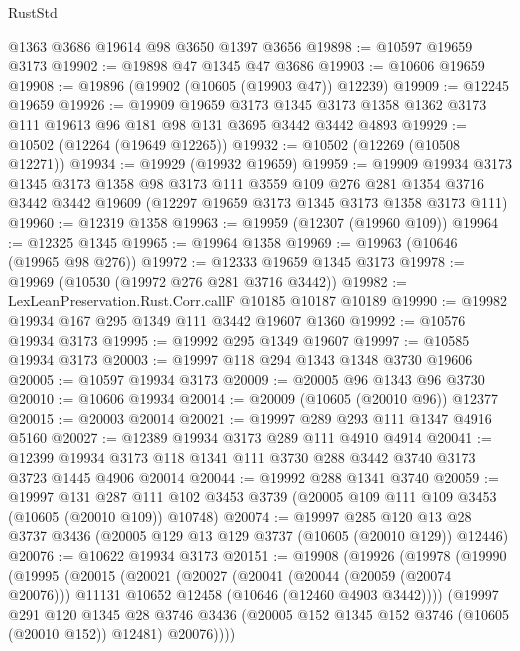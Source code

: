 \begin{lexlean}{RustStd}
\begin{coremodule}
    @1363
    @3686
    @19614
    @98
    @3650
    @1397
    @3656
@19898 := @10597 @19659 @3173
@19902 := @19898 @47 @1345 @47 @3686
@19903 := @10606 @19659
@19908 := @19896 (@19902 (@10605 (@19903 @47)) @12239)
@19909 := @12245 @19659
@19926 := @19909
    @19659
    @3173
    @1345
    @3173
    @1358
    @1362
    @3173
    @111
    @19613
    @96
    @181
    @98
    @131
    @3695
    @3442
    @3442
    @4893
@19929 := @10502 (@12264 (@19649 @12265))
@19932 := @10502 (@12269 (@10508 @12271))
@19934 := @19929 (@19932 @19659)
@19959 := @19909
    @19934
    @3173
    @1345
    @3173
    @1358
    @98
    @3173
    @111
    @3559
    @109
    @276
    @281
    @1354
    @3716
    @3442
    @3442
    @19609
    (@12297 @19659 @3173 @1345 @3173 @1358 @3173 @111)
@19960 := @12319 @1358
@19963 := @19959 (@12307 (@19960 @109))
@19964 := @12325 @1345
@19965 := @19964 @1358
@19969 := @19963 (@10646 (@19965 @98 @276))
@19972 := @12333 @19659 @1345 @3173
@19978 := @19969 (@10530 (@19972 @276 @281 @3716 @3442))
@19982 := LexLeanPreservation.Rust.Corr.callF @10185 @10187 @10189
@19990 := @19982 @19934 @167 @295 @1349 @111 @3442 @19607 @1360
@19992 := @10576 @19934 @3173
@19995 := @19992 @295 @1349 @19607
@19997 := @10585 @19934 @3173
@20003 := @19997 @118 @294 @1343 @1348 @3730 @19606
@20005 := @10597 @19934 @3173
@20009 := @20005 @96 @1343 @96 @3730
@20010 := @10606 @19934
@20014 := @20009 (@10605 (@20010 @96)) @12377
@20015 := @20003 @20014
@20021 := @19997 @289 @293 @111 @1347 @4916 @5160
@20027 := @12389 @19934 @3173 @289 @111 @4910 @4914
@20041 := @12399 @19934 @3173 @118 @1341 @111 @3730 @288 @3442 @3740 @3173 @3723 @1445 @4906 @20014
@20044 := @19992 @288 @1341 @3740
@20059 := @19997
    @131
    @287
    @111
    @102
    @3453
    @3739
    (@20005 @109 @111 @109 @3453 (@10605 (@20010 @109)) @10748)
@20074 := @19997
    @285
    @120
    @13
    @28
    @3737
    @3436
    (@20005 @129 @13 @129 @3737 (@10605 (@20010 @129)) @12446)
@20076 := @10622 @19934 @3173
@20151 := @19908
    (@19926
      (@19978
        (@19990
          (@19995
            (@20015
              (@20021
                (@20027
                  (@20041
                    (@20044 (@20059 (@20074 @20076)))
                    @11131
                    @10652
                    @12458
                    (@10646 (@12460 @4903 @3442))))
                (@19997
                  @291
                  @120
                  @1345
                  @28
                  @3746
                  @3436
                  (@20005 @152 @1345 @152 @3746 (@10605 (@20010 @152)) @12481)
                  @20076))))

\end{coremodule}
\end{lexlean}
